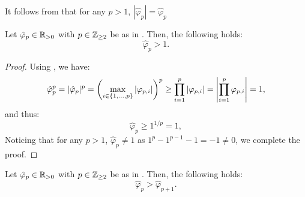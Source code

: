 \documentclass{article}
\begin{document}
    \begin{remark}
      It follows from  that for any $p > 1$, $|\hat{\varphi}_p| = \hat{\varphi}_p$
    \end{remark}

    \begin{theorem} \label{thm:A-10}
      Let $\hat{\varphi}_{p} \in \mathbb{R}_{>0}$ with $p \in \mathbb{Z}_{\geq 2}$ be as in . Then, the following holds:
      \begin{equation} 
        \hat{\varphi}_p > 1.
      \end{equation}
    \end{theorem}

    \begin{proof}
      Using , we have:
      \begin{equation} 
        \hat{\varphi}_p^p = |\hat{\varphi}_p|^p = \left(\max_{i \in \{1, \dots, p\}} |\varphi_{p, i}|\right)^p \geq \prod_{i=1}^p |\varphi_{p, i}| 
        = \left|\prod_{i=1}^p \varphi_{p, i}\right| = 1,
      \end{equation}
      and thus:
      \begin{equation} 
        \hat{\varphi}_p \geq 1^{1/p} = 1,
      \end{equation}
      Noticing that for any $p > 1$, $\hat{\varphi}_p \neq 1$ as $1^p - 1^{p-1} -1 = -1 \neq 0$, we complete the proof.
    \end{proof}

    \begin{theorem} \label{thm:A-11}
      Let $\hat{\varphi}_{p} \in \mathbb{R}_{>0}$ with $p \in \mathbb{Z}_{\geq 2}$ be as in . Then, the following holds:
      \begin{equation} 
        \hat{\varphi}_p > \hat{\varphi}_{p+1}.
      \end{equation}
    \end{theorem}
    
\end{document}
